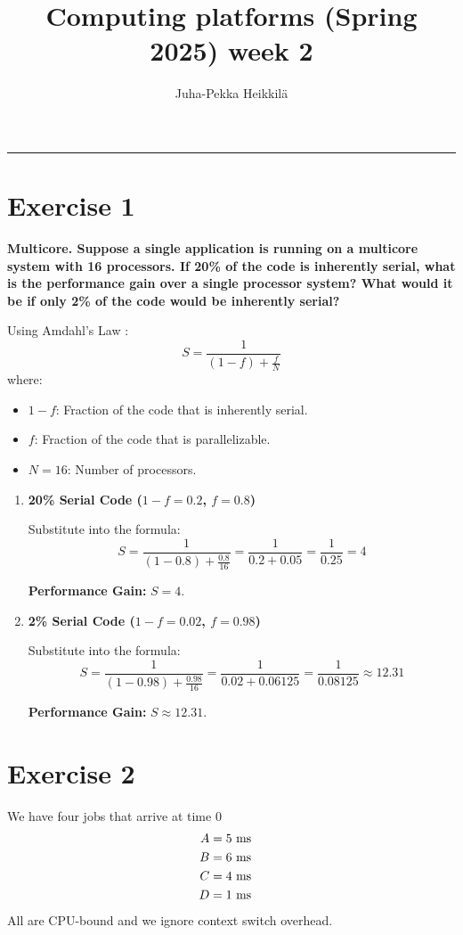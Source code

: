 \documentclass{article}
\title{Computing platforms (Spring 2025)\newline
week 2}
\author{Juha-Pekka Heikkilä}
\renewcommand{\maketitle}{%
  \begin{leftmark}
    \vspace*{\baselineskip} %



    \textbf{\fontsize{18}{36}\selectfont \thetitle} %

     \vspace{0.05cm} %
    \vspace{\baselineskip} %
     \rule{\textwidth}{0.4pt} %

   \end{leftmark}
}
\newcommand{\exercise}[1]{
    \section*{Exercise #1}
    \markboth{Exercise #1}{}
}
\begin{document}
\maketitle


\exercise{1}
{\bf Multicore. Suppose a single application is running on
a multicore system with 16 processors. If 20\% of the code
is inherently serial, what is the performance gain over
a single processor system? What would it be if only 2\% of
the code would be inherently serial?}
\newline

Using Amdahl's Law \cite{stallings4.3}:
\[
S = \frac{1}{(1 - f) + \frac{f}{N}}
\]
where:
\begin{itemize}
    \item \( 1 - f \): Fraction of the code that is inherently serial.
    \item \( f \): Fraction of the code that is parallelizable.
    \item \( N = 16 \): Number of processors.
\end{itemize}

\begin{enumerate}[label=\textbf{\alph*})]
    \item \textbf{20\% Serial Code (\( 1 - f = 0.2 \), \( f = 0.8 \))}

    Substitute into the formula:
    \[
    S = \frac{1}{(1 - 0.8) + \frac{0.8}{16}} = \frac{1}{0.2 + 0.05} = \frac{1}{0.25} = 4
    \]

    \textbf{Performance Gain:} \( S = 4 \).

    \item \textbf{2\% Serial Code (\( 1 - f = 0.02 \), \( f = 0.98 \))}

    Substitute into the formula:
    \[
    S = \frac{1}{(1 - 0.98) + \frac{0.98}{16}} = \frac{1}{0.02 + 0.06125} = \frac{1}{0.08125} \approx 12.31
    \]

    \textbf{Performance Gain:} \( S \approx 12.31 \).
\end{enumerate}

\newpage

\exercise{2}


We have four jobs that arrive at time 0
\[
\noindent
\begin{aligned}    
A &= 5\text{ ms} \quad \\
B &= 6\text{ ms} \quad \\
C &= 4\text{ ms} \quad \\
D &= 1\text{ ms}
\end{aligned}
\]
All are CPU-bound and we ignore context switch overhead.
\end{document}
